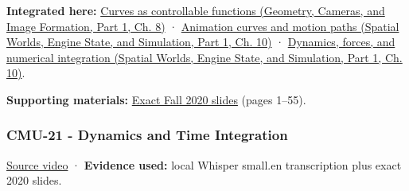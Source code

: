 \textbf{Integrated here:} \href{../03-Geometry-Cameras-and-Image-Formation-P01/main.pdf\#03-visual-computing-i-ch001-curves-as-controllable-functions}{Curves as controllable functions (Geometry, Cameras, and Image Formation, Part 1, Ch. 8)} · \href{../05-Spatial-Worlds-Engine-State-and-Simulation-P01/main.pdf\#04-visual-computing-ii-ch029-animation-curves-and-motion-paths}{Animation curves and motion paths (Spatial Worlds, Engine State, and Simulation, Part 1, Ch. 10)} · \href{../05-Spatial-Worlds-Engine-State-and-Simulation-P01/main.pdf\#04-visual-computing-ii-ch029-dynamics-forces-and-numerical-integration}{Dynamics, forces, and numerical integration (Spatial Worlds, Engine State, and Simulation, Part 1, Ch. 10)}.

\textbf{Supporting materials:} \href{https://15462.courses.cs.cmu.edu/fall2020content/lectures/20_introanimation/20_introanimation_slides.pdf}{Exact Fall 2020 slides} (pages 1--55).

\subsubsection{CMU-21 - Dynamics and Time Integration}\label{04-visual-computing-ii-ch036-cmu-21---dynamics-and-time-integration}

\hypertarget{04-visual-computing-ii-ch036-cmu-21---dynamics-and-time-integration}{}

\href{https://www.youtube.com/watch?v=Fi9xu3z97W4}{Source video} · \textbf{Evidence used:} local Whisper small.en transcription plus exact 2020 slides.

